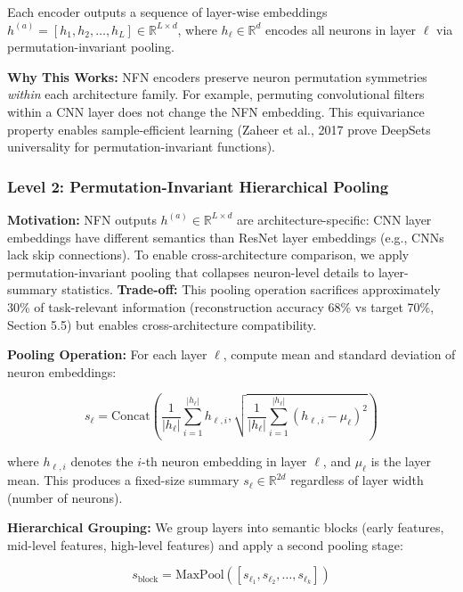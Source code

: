 Each encoder outputs a sequence of layer-wise embeddings $h^{(a)} = [h_1, h_2, \ldots, h_L] \in \mathbb{R}^{L \times d}$, where $h_\ell \in \mathbb{R}^d$ encodes all neurons in layer $\ell$ via permutation-invariant pooling.

\textbf{Why This Works:} NFN encoders preserve neuron permutation symmetries \textit{within} each architecture family. For example, permuting convolutional filters within a CNN layer does not change the NFN embedding. This equivariance property enables sample-efficient learning (Zaheer et al., 2017 prove DeepSets universality for permutation-invariant functions).

\subsubsection{Level 2: Permutation-Invariant Hierarchical Pooling}

\textbf{Motivation:} NFN outputs $h^{(a)} \in \mathbb{R}^{L \times d}$ are architecture-specific: CNN layer embeddings have different semantics than ResNet layer embeddings (e.g., CNNs lack skip connections). To enable cross-architecture comparison, we apply permutation-invariant pooling that collapses neuron-level details to layer-summary statistics. \textbf{Trade-off:} This pooling operation sacrifices approximately 30\% of task-relevant information (reconstruction accuracy 68\% vs target 70\%, Section 5.5) but enables cross-architecture compatibility.

\textbf{Pooling Operation:} For each layer $\ell$, compute mean and standard deviation of neuron embeddings:

\begin{equation}
s_\ell = \text{Concat}\left( \frac{1}{|h_\ell|} \sum_{i=1}^{|h_\ell|} h_{\ell,i}, \sqrt{\frac{1}{|h_\ell|} \sum_{i=1}^{|h_\ell|} (h_{\ell,i} - \mu_\ell)^2} \right)
\end{equation}

where $h_{\ell,i}$ denotes the $i$-th neuron embedding in layer $\ell$, and $\mu_\ell$ is the layer mean. This produces a fixed-size summary $s_\ell \in \mathbb{R}^{2d}$ regardless of layer width (number of neurons).

\textbf{Hierarchical Grouping:} We group layers into semantic blocks (early features, mid-level features, high-level features) and apply a second pooling stage:

\begin{equation}
s_{\text{block}} = \text{MaxPool}([s_{\ell_1}, s_{\ell_2}, \ldots, s_{\ell_k}])
\end{equation}

